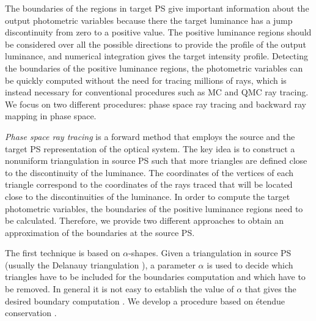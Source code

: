 The boundaries of the regions in target PS give important information about the output photometric variables because there the target luminance has a jump discontinuity from zero to a positive value. 
The positive luminance regions should be considered over all the possible directions to provide the profile of the output luminance, and numerical integration gives the target intensity profile. Detecting the boundaries of the positive luminance regions, the photometric variables can be quickly computed without the need for tracing millions of rays, which is instead necessary for conventional procedures such as MC and QMC ray tracing. We focus on two different procedures: phase space ray tracing and backward ray mapping in phase space.

\textit{Phase space ray tracing} is a forward method that employs the source and the target PS representation of the optical system. The key idea is to construct a nonuniform triangulation in source PS such that more triangles are defined close to the discontinuity of the luminance. The coordinates of the vertices of each triangle correspond to the coordinates of the rays traced that will be located close to the discontinuities of the luminance. In order to compute the target photometric variables, the boundaries of the positive luminance regions need to be calculated. 
Therefore, we provide two different approaches to obtain an approximation of the boundaries at the source PS.

The first technique is based on $\alpha$-shapes. 
Given a triangulation in source PS (usually the Delanauy triangulation \cite{marsden2003texts}), a parameter $\alpha$ is used to decide which triangles have to be included for the boundaries computation and which have to be removed. In general it is not easy to establish the value of $\alpha$ that gives the desired boundary computation \cite{teichmann1998surface}. We develop a procedure based on \'{e}tendue conservation \cite{filosa2015new}. 

